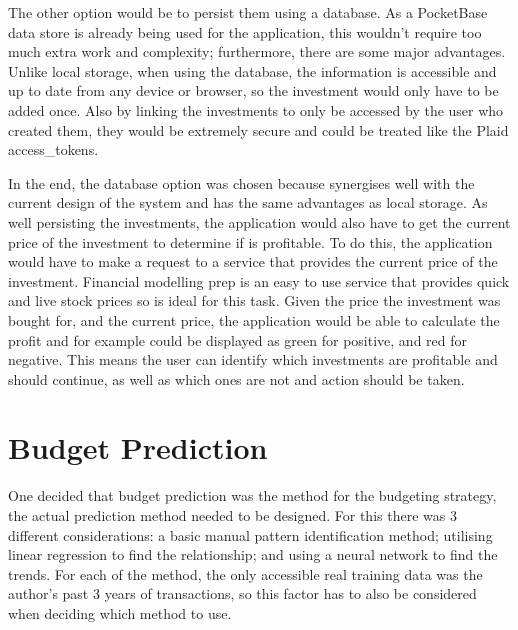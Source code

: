 The other option would be to persist them using a database. As a PocketBase data store is already being used for the application, this wouldn't require too much extra work and complexity; furthermore, there are some major advantages. Unlike local storage, when using the database, the information is accessible and up to date from any device or browser, so the investment would only have to be added once. Also by linking the investments to only be accessed by the user who created them, they would be extremely secure and could be treated like the Plaid access\_tokens.

In the end, the database option was chosen because synergises well with the current design of the system and has the same advantages as local storage. As well persisting the investments, the application would also have to get the current price of the investment to determine if is profitable. To do this, the application would have to make a request to a service that provides the current price of the investment. Financial modelling prep is an easy to use service that provides quick and live stock prices so is ideal for this task. Given the price the investment was bought for, and the current price, the application would be able to calculate the profit and for example could be displayed as green for positive, and red for negative. This means the user can identify which investments are profitable and should continue, as well as which ones are not and action should be taken. 

\section{Budget Prediction}
One decided that budget prediction was the method for the budgeting strategy, the actual prediction method needed to be designed. For this there was 3 different considerations: a basic manual pattern identification method; utilising linear regression to find the relationship; and using a neural network to find the trends. For each of the method, the only accessible real training data was the author's past 3 years of transactions, so this factor has to also be considered when deciding which method to use.

